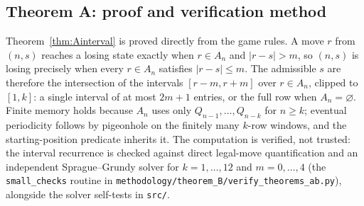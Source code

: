 \subsection{Theorem A: proof and verification method}\label{sec:methodA}
Theorem~\ref{thm:Ainterval} is proved directly from the game rules. A move $r$ from $(n,s)$ reaches a losing state exactly when $r\in A_n$ and $|r-s|>m$, so $(n,s)$ is losing precisely when every $r\in A_n$ satisfies $|r-s|\le m$. The admissible $s$ are therefore the intersection of the intervals $[r-m,r+m]$ over $r\in A_n$, clipped to $[1,k]$: a single interval of at most $2m+1$ entries, or the full row when $A_n=\varnothing$. Finite memory holds because $A_n$ uses only $Q_{n-1},\ldots,Q_{n-k}$ for $n\ge k$; eventual periodicity follows by pigeonhole on the finitely many $k$-row windows, and the starting-position predicate inherits it.
The computation is verified, not trusted: the interval recurrence is checked against direct legal-move quantification and an independent Sprague--Grundy solver for $k=1,\ldots,12$ and $m=0,\ldots,4$ (the \texttt{small\_checks} routine in \texttt{methodology/theorem\_B/verify\_theorems\_ab.py}), alongside the solver self-tests in \texttt{src/}.
